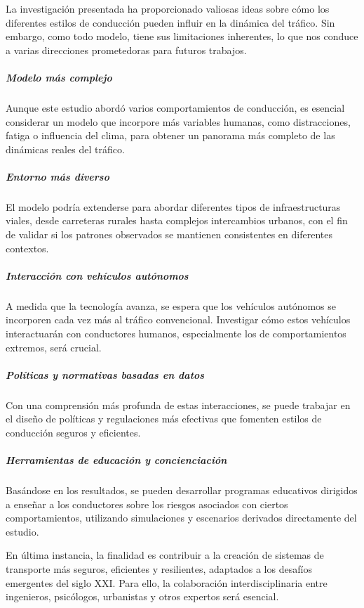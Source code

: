La investigación presentada ha proporcionado valiosas ideas sobre cómo los diferentes estilos de conducción pueden influir en la dinámica del tráfico. Sin embargo, como todo modelo, tiene sus limitaciones inherentes, lo que nos conduce a varias direcciones prometedoras para futuros trabajos.

\subparagraph{Modelo más complejo}

Aunque este estudio abordó varios comportamientos de conducción, es esencial considerar un modelo que
incorpore más variables humanas, como distracciones, fatiga o influencia del clima, para obtener un panorama más completo de las dinámicas reales
del tráfico.

\subparagraph{Entorno más diverso}

El modelo podría extenderse para abordar diferentes tipos de infraestructuras viales,
desde carreteras rurales hasta complejos intercambios urbanos, con el fin de validar si los patrones observados se mantienen consistentes
en diferentes contextos.

\subparagraph{Interacción con vehículos autónomos}

A medida que la tecnología avanza, se espera que los vehículos autónomos se incorporen cada vez
más al tráfico convencional. Investigar cómo estos vehículos interactuarán con conductores humanos, especialmente los de comportamientos extremos,
será crucial.

\subparagraph{Políticas y normativas basadas en datos}

Con una comprensión más profunda de estas interacciones, se puede trabajar en el diseño de políticas
y regulaciones más efectivas que fomenten estilos de conducción seguros y eficientes.

\subparagraph{Herramientas de educación y concienciación}

Basándose en los resultados, se pueden desarrollar programas educativos dirigidos a enseñar a los
conductores sobre los riesgos asociados con ciertos comportamientos, utilizando simulaciones y escenarios derivados directamente del estudio.

En última instancia, la finalidad es contribuir a la creación de sistemas de transporte más seguros, eficientes y resilientes,
adaptados a los desafíos emergentes del siglo XXI. Para ello, la colaboración interdisciplinaria entre ingenieros, psicólogos, urbanistas y otros expertos
será esencial.
